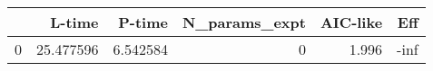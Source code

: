\begin{tabular}{lrrrrr}
\toprule
{} &     L-time &    P-time &  N\_params\_expt &  AIC-like &  Eff \\
\midrule
0 &  25.477596 &  6.542584 &              0 &     1.996 & -inf \\
\bottomrule
\end{tabular}
